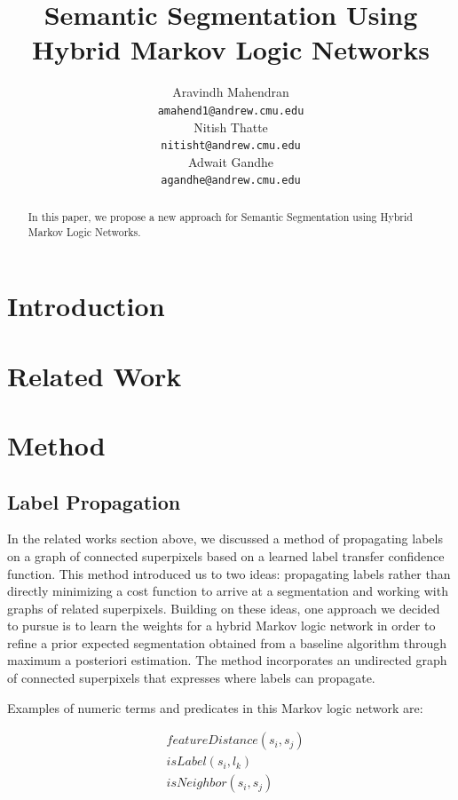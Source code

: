 \documentclass{article} %
\title{Semantic Segmentation Using Hybrid Markov Logic Networks}
\author{
Aravindh Mahendran \\
\texttt{amahend1@andrew.cmu.edu} \\ 
\And
Nitish Thatte \\
\texttt{nitisht@andrew.cmu.edu} \\
\AND
Adwait Gandhe \\
\texttt{agandhe@andrew.cmu.edu} \\
}
\begin{document}
\maketitle

\begin{abstract}
In this paper, we propose a new approach for Semantic Segmentation using Hybrid Markov Logic Networks. 
\end{abstract}


\section{Introduction}



\section{Related Work}


\section{Method}

\subsection{Label Propagation}
	In the related works section above, we discussed a method of propagating labels on a graph of connected superpixels based on a learned label transfer confidence function. This method introduced us to two ideas: propagating labels rather than directly minimizing a cost function to arrive at a segmentation and working with graphs of related superpixels. Building on these ideas, one approach we decided to pursue is to learn the weights for a hybrid Markov logic network in order to refine a prior expected segmentation obtained from a baseline algorithm through maximum a posteriori estimation. The method incorporates an undirected graph of connected superpixels that expresses where labels can propagate.

Examples of numeric terms and predicates in this Markov logic network are:

\begin{align*}
	&featureDistance(s_i,s_j)\\
	&isLabel(s_i,l_k) \\
	&isNeighbor(s_i,s_j)
\end{align*}
\end{document}

